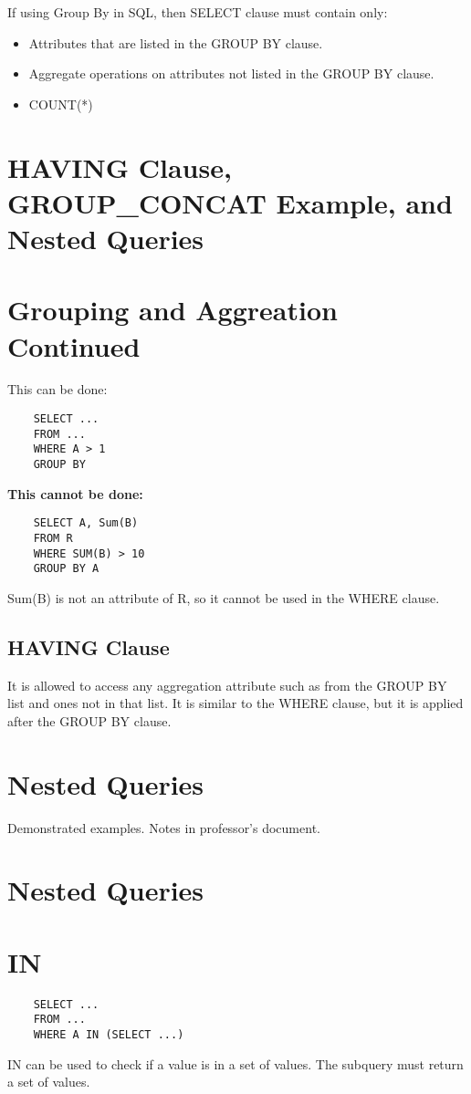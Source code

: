 \documentclass[twoside]{article}
\begin{document}
If using Group By in SQL, then SELECT clause must contain only:
\begin{itemize}
    \item Attributes that are listed in the GROUP BY clause.
    \item Aggregate operations on attributes not listed in the GROUP BY clause.
    \item COUNT(*)
\end{itemize}

\newpage
\section{HAVING Clause, GROUP\_CONCAT Example, and Nested Queries}

\section*{Grouping and Aggreation Continued}

This can be done:
\begin{verbatim}
    SELECT ...
    FROM ... 
    WHERE A > 1
    GROUP BY
\end{verbatim}

\textbf{This cannot be done:}
\begin{verbatim}
    SELECT A, Sum(B)
    FROM R
    WHERE SUM(B) > 10
    GROUP BY A
\end{verbatim}
Sum(B) is not an attribute of R, so it cannot be used in the WHERE clause.

\subsection*{HAVING Clause}
It is allowed to access any aggregation attribute such as from the GROUP BY
list and ones not in that list. It is similar to the WHERE clause, but it 
is applied after the GROUP BY clause.

\section*{Nested Queries}
Demonstrated examples. Notes in professor's document.

\newpage
\section{Nested Queries}

\section*{IN}
\begin{verbatim}
    SELECT ...
    FROM ...
    WHERE A IN (SELECT ...)
\end{verbatim}
IN can be used to check if a value is in a set of values. The subquery must
return a set of values.
\end{document}
